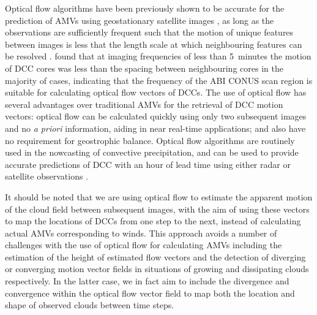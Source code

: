 \documentclass[amt, manuscript]{copernicus}
\begin{document}
Optical flow algorithms have been previously shown to be accurate for the prediction of AMVs using geostationary satellite images \citep{wu_deriving_2016}, as long as the observations are sufficiently frequent such that the motion of unique features between images is less that the length scale at which neighbouring features can be resolved \citep{bresky_feasibility_2006}.
\citet{heikenfeld_tobac_2019} found that at imaging frequencies of less than 5~minutes the motion of DCC cores was less than the spacing between neighbouring cores in the majority of cases, indicating that the frequency of the ABI CONUS scan region is suitable for calculating optical flow vectors of DCCs.
The use of optical flow has several advantages over traditional AMVs for the retrieval of DCC motion vectors: optical flow can be calculated quickly using only two subsequent images and no \textit{a priori} information, aiding in near real-time applications; and also have no requirement for geostrophic balance. 
Optical flow algorithms are routinely used in the nowcasting of convective precipitation, and can be used to provide accurate predictions of DCC with an hour of lead time using either radar or satellite observations \citep[e.g.,][]{bowler_development_2004, bechini_enhanced_2017, woo_operational_2017}.

It should be noted that we are using optical flow to estimate the apparent motion of the cloud field between subsequent images, with the aim of using these vectors to map the locations of DCCs from one step to the next, instead of calculating actual AMVs corresponding to winds.
This approach avoids a number of challenges with the use of optical flow for calculating AMVs including the estimation of the height of estimated flow vectors and the detection of diverging or converging motion vector fields in situations of growing and dissipating clouds respectively.
In the latter case, we in fact aim to include the divergence and convergence within the optical flow vector field to map both the location and shape of observed clouds between time steps.
\end{document}
